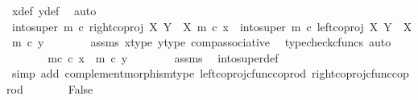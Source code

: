 \begin{isabellebody}
\ x{\isacharunderscore}{\kern0pt}def\ y{\isacharunderscore}{\kern0pt}def\ \isamarkupfalse%
\ auto\isanewline
\ \ \ \ \isamarkupfalse%
\ \isamarkupfalse%
\ {\isachardoublequoteopen}{\isacharparenleft}{\kern0pt}into{\isacharunderscore}{\kern0pt}super\ m\ {\isasymcirc}\isactrlsub c\ right{\isacharunderscore}{\kern0pt}coproj\ X\ {\isacharparenleft}{\kern0pt}Y\ {\isasymsetminus}\ {\isacharparenleft}{\kern0pt}X{\isacharcomma}{\kern0pt}\ m{\isacharparenright}{\kern0pt}{\isacharparenright}{\kern0pt}{\isacharparenright}{\kern0pt}\ {\isasymcirc}\isactrlsub c\ x{\isacharprime}{\kern0pt}\ {\isacharequal}{\kern0pt}\ {\isacharparenleft}{\kern0pt}into{\isacharunderscore}{\kern0pt}super\ m\ {\isasymcirc}\isactrlsub c\ left{\isacharunderscore}{\kern0pt}coproj\ X\ {\isacharparenleft}{\kern0pt}Y\ {\isasymsetminus}\ {\isacharparenleft}{\kern0pt}X{\isacharcomma}{\kern0pt}\ m{\isacharparenright}{\kern0pt}{\isacharparenright}{\kern0pt}{\isacharparenright}{\kern0pt}\ {\isasymcirc}\isactrlsub c\ y{\isacharprime}{\kern0pt}{\isachardoublequoteclose}\isanewline
\ \ \ \ \ \ \isamarkupfalse%
\ assms\ x{\isacharprime}{\kern0pt}{\isacharunderscore}{\kern0pt}type\ y{\isacharprime}{\kern0pt}{\isacharunderscore}{\kern0pt}type\ comp{\isacharunderscore}{\kern0pt}associative{}\ \isamarkupfalse%
\ {\isacharparenleft}{\kern0pt}typecheck{\isacharunderscore}{\kern0pt}cfuncs{\isacharcomma}{\kern0pt}\ auto{\isacharparenright}{\kern0pt}\isanewline
\ \ \ \ \isamarkupfalse%
\ \isamarkupfalse%
\ {\isachardoublequoteopen}m\isactrlsup c\ {\isasymcirc}\isactrlsub c\ x{\isacharprime}{\kern0pt}\ {\isacharequal}{\kern0pt}\ m\ {\isasymcirc}\isactrlsub c\ y{\isacharprime}{\kern0pt}{\isachardoublequoteclose}\isanewline
\ \ \ \ \ \ \isamarkupfalse%
\ assms\ \isamarkupfalse%
\ into{\isacharunderscore}{\kern0pt}super{\isacharunderscore}{\kern0pt}def\isanewline
\ \ \ \ \ \ \isamarkupfalse%
\ {\isacharparenleft}{\kern0pt}simp\ add{\isacharcolon}{\kern0pt}\ complement{\isacharunderscore}{\kern0pt}morphism{\isacharunderscore}{\kern0pt}type\ left{\isacharunderscore}{\kern0pt}coproj{\isacharunderscore}{\kern0pt}cfunc{\isacharunderscore}{\kern0pt}coprod\ right{\isacharunderscore}{\kern0pt}coproj{\isacharunderscore}{\kern0pt}cfunc{\isacharunderscore}{\kern0pt}coprod{\isacharparenright}{\kern0pt}\isanewline
\ \ \ \ \isamarkupfalse%
\ \isamarkupfalse%
\ False\isanewline
\ \ \ \ \ \ \isamarkupfalse%

\end{isabellebody}
